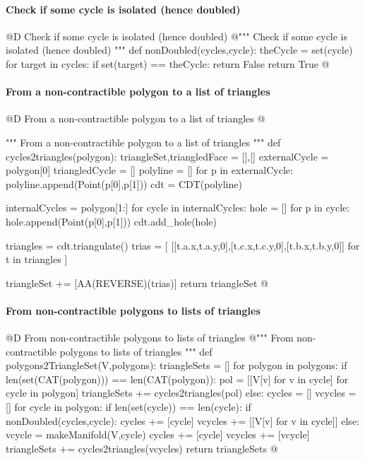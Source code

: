 \documentclass[11pt,oneside]{article}    %
\begin{document}
\paragraph{Check if some cycle is isolated (hence doubled)}
@D Check if some cycle is isolated (hence doubled) 
@{""" Check if some cycle is isolated (hence doubled) """
def nonDoubled(cycles,cycle):
    theCycle = set(cycle)
    for target in cycles:
        if set(target) == theCycle: return False
    return True
@}

\paragraph{From a non-contractible polygon to a list of triangles}
@D From a non-contractible polygon to a list of triangles 
@{""" From a non-contractible polygon to a list of triangles """
def cycles2triangles(polygon): 
    triangleSet,triangledFace = [],[]
    externalCycle = polygon[0]
    triangledCycle = []
    polyline = []
    for p in externalCycle:
        polyline.append(Point(p[0],p[1]))
    cdt = CDT(polyline)

    internalCycles = polygon[1:]
    for cycle in internalCycles:
        hole = []
        for p in cycle:
            hole.append(Point(p[0],p[1]))
        cdt.add_hole(hole)

    triangles = cdt.triangulate()
    trias = [ [[t.a.x,t.a.y,0],[t.c.x,t.c.y,0],[t.b.x,t.b.y,0]] 
        for t in triangles ]
    
    triangleSet += [AA(REVERSE)(trias)]
    return triangleSet
@}

\paragraph{From non-contractible polygons to lists of triangles}
@D From non-contractible polygons to lists of triangles 
@{""" From non-contractible polygons to lists of triangles """
def polygons2TriangleSet(V,polygons):
    triangleSets = []
    for polygon in polygons:
        if len(set(CAT(polygon))) == len(CAT(polygon)):
            pol = [[V[v] for v in cycle] for cycle in polygon]
            triangleSets += cycles2triangles(pol)
        else:
            cycles = []
            vcycles = []
            for cycle in polygon:
                if len(set(cycle)) == len(cycle):
                    if nonDoubled(cycles,cycle):
                        cycles += [cycle]
                        vcycles += [[V[v] for v in cycle]]
                else:
                    vcycle = makeManifold(V,cycle)
                    cycles += [cycle]
                    vcycles += [vcycle]
            triangleSets += cycles2triangles(vcycles)
    return triangleSets
@}
\end{document}
